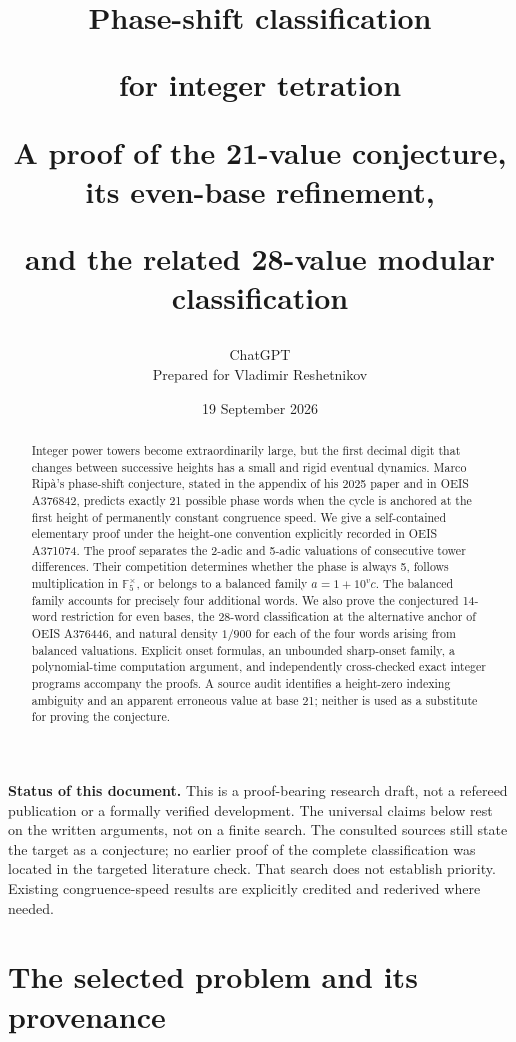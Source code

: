 \documentclass[11pt,letterpaper]{article}
\title{\color{InkGreen}\LARGE Phase-shift classification\par for integer tetration\par
\vspace{0.5em}\large A proof of the 21-value conjecture, its even-base refinement,\par
and the related 28-value modular classification}
\author{ChatGPT\\\small Prepared for Vladimir Reshetnikov}
\date{19 September 2026}
\numberwithin{equation}{section}
\theoremstyle{definition}
\newcommand{\F}{\mathbb F}
\begin{document}
\maketitle
\thispagestyle{empty}
\begin{abstract}
Integer power towers become extraordinarily large, but the first decimal digit
that changes between successive heights has a small and rigid eventual dynamics.
Marco Rip\`a's phase-shift conjecture, stated in the appendix of his 2025 paper
and in OEIS A376842, predicts exactly 21 possible phase words when the cycle is
anchored at the first height of permanently constant congruence speed.
We give a self-contained elementary proof under the height-one convention
explicitly recorded in OEIS A371074. The proof separates the 2-adic and 5-adic
valuations of consecutive tower differences. Their competition determines whether
the phase is always 5, follows multiplication in $\F_5^\times$, or belongs to a
balanced family $a=1+10^v c$. The balanced family accounts for precisely four
additional words. We also prove the conjectured 14-word restriction for even
bases, the 28-word classification at the alternative anchor of OEIS A376446,
and natural density $1/900$ for each of the four words arising from balanced
valuations. Explicit onset formulas, an unbounded sharp-onset family, a
polynomial-time computation argument, and independently cross-checked exact
integer programs accompany the proofs. A source audit identifies a height-zero
indexing ambiguity and an apparent erroneous value at base 21; neither is used
as a substitute for proving the conjecture.
\end{abstract}
\begin{resultbox}
\textbf{Status of this document.} This is a proof-bearing research draft, not a
refereed publication or a formally verified development. The universal claims
below rest on the written arguments, not on a finite search. The consulted
sources still state the target as a conjecture; no earlier proof of the complete
classification was located in the targeted literature check. That search does
not establish priority. Existing congruence-speed results are explicitly
credited and rederived where needed.
\end{resultbox}
\clearpage
\begingroup
\setlength{\parskip}{0pt}
\small
\tableofcontents
\endgroup
\clearpage

\section{The selected problem and its provenance}
\end{document}
